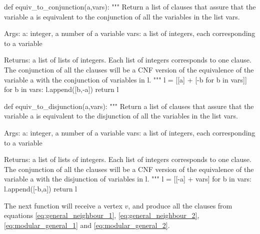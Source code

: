 \documentclass[letterpaper]{article}
\begin{document}
\begin{pyblock}
def equiv_to_conjunction(a,vars):
   """
   Return a list of clauses that assure that the variable a is 
   equivalent to the conjunction of all the variables in the list 
   vars.

   Args:
      a: integer, a number of a variable
      vars: a list of integers, each corresponding to a variable

   Returns:
      a list of lists of integers.  Each list of integers 
      corresponds to one clause.  The conjunction of all the 
      clauses will be a CNF version of the equivalence of the 
      variable a with the conjunction of variables in l.
   """
   l = [[a] + [-b for b in vars]]
   for b in vars:
      l.append([b,-a])
   return l

def equiv_to_disjunction(a,vars):
   """
   Return a list of clauses that assure that the variable a is 
   equivalent to the disjunction of all the variables in the list 
   vars.

   Args:
      a: integer, a number of a variable
      vars: a list of integers, each corresponding to a variable

   Returns:
      a list of lists of integers.  Each list of integers 
      corresponds to one clause.  The conjunction of all the 
      clauses will be a CNF version of the equivalence of the 
      variable a with the disjunction of variables in l.
   """
   l = [[-a] + vars]
   for b in vars:
      l.append([-b,a])
   return l
\end{pyblock}

The next function will receive a vertex $v$, and produce all the clauses from
equations \eqref{eq:general_neighbour_1}, \eqref{eq:general_neighbour_2},
\eqref{eq:modular_general_1} and \eqref{eq:modular_general_2}. 
\end{document}
